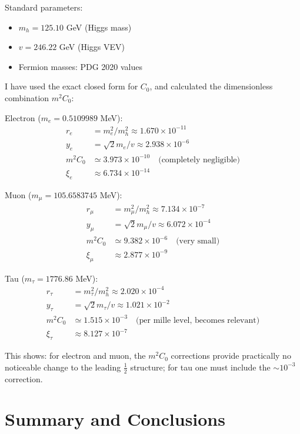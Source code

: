 \documentclass[12pt,a4paper]{article}
\theoremstyle{definition}
\begin{document}
	\begin{numerical}
		Standard parameters:
		\begin{itemize}
			\item $m_h = 125.10$ GeV (Higgs mass)
			\item $v = 246.22$ GeV (Higgs VEV)
			\item Fermion masses: PDG 2020 values
		\end{itemize}
		
		I have used the exact closed form for $C_0$, and calculated the dimensionless combination $m^2C_0$:
		
		Electron ($m_e = 0.5109989$ MeV):
		\begin{align}
			r_e &= m_e^2/m_h^2 \approx 1.670 \times 10^{-11}\\
			y_e &= \sqrt{2} m_e/v \approx 2.938 \times 10^{-6}\\
			m^2C_0 &\simeq 3.973 \times 10^{-10} \quad \text{(completely negligible)}\\
			\xi_e &\approx 6.734 \times 10^{-14}
		\end{align}
		
		Muon ($m_\mu = 105.6583745$ MeV):
		\begin{align}
			r_\mu &= m_\mu^2/m_h^2 \approx 7.134 \times 10^{-7}\\
			y_\mu &= \sqrt{2} m_\mu/v \approx 6.072 \times 10^{-4}\\
			m^2C_0 &\simeq 9.382 \times 10^{-6} \quad \text{(very small)}\\
			\xi_\mu &\approx 2.877 \times 10^{-9}
		\end{align}
		
		Tau ($m_\tau = 1776.86$ MeV):
		\begin{align}
			r_\tau &= m_\tau^2/m_h^2 \approx 2.020 \times 10^{-4}\\
			y_\tau &= \sqrt{2} m_\tau/v \approx 1.021 \times 10^{-2}\\
			m^2C_0 &\simeq 1.515 \times 10^{-3} \quad \text{(per mille level, becomes relevant)}\\
			\xi_\tau &\approx 8.127 \times 10^{-7}
		\end{align}
		
		This shows: for electron and muon, the $m^2C_0$ corrections provide practically no noticeable change to the leading $\frac{1}{2}$ structure; for tau one must include the $\sim 10^{-3}$ correction.
	\end{numerical}
	

	\section{Summary and Conclusions}
	
\end{document}
